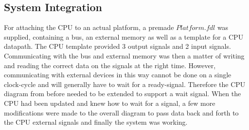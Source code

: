 \documentclass[12pt,a4paper]{article}
\begin{document}
\subsection{System Integration}
	For attaching the CPU to an actual platform, a premade $Platform.fdl$ was supplied, containing a bus, an external memory as well as a template for a CPU datapath. The CPU template provided 3 output signals and 2 input signals. Communicating with the bus and external memory was then a matter of writing and reading the correct data on the signals at the right time. However, communicating with external devices in this way cannot be done on a single clock-cycle and will generally have to wait for a ready-signal. Therefore the CPU diagram from before needed to be extended to support a wait signal. When the CPU had been updated and knew how to wait for a signal, a few more modifications were made to the overall diagram to pass data back and forth to the CPU external signals and finally the system was working.
	
\end{document}
